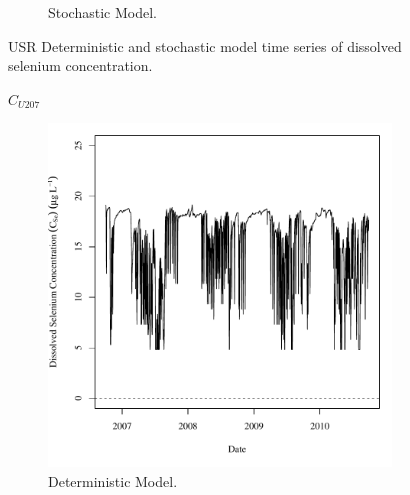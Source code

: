 \begin{linenumbers}
\begin{landscape}
\begin{figure}
\begin{subfigure}{0.7\textwidth}
			\caption{Stochastic Model.}
		\end{subfigure}
		\caption{USR Deterministic and stochastic model time series of dissolved selenium concentration.}
	\end{figure}
\end{landscape}

\subfiguremid
\begin{landscape}
	\begin{figure}
		$ C_{U207} $
		\begin{subfigure}{0.7\textwidth}
			\centering
			\includegraphics[width=\tableCustomSize]{"Figures/Results_USR/Deterministic/c TS HRC"}
			\caption{Deterministic Model.}
		\end{subfigure}%
		\begin{subfigure}{0.7\textwidth}
			\centering

\end{subfigure}
\end{figure}
\end{landscape}
\end{linenumbers}
